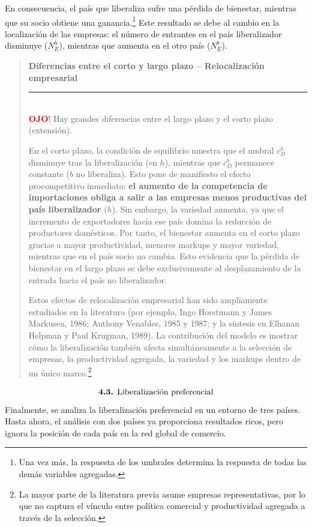 \documentclass[10pt,a4paper]{article}
\newenvironment{specialblock}[1]{%
      \begin{quote} %
      \small %
      \noindent\textbf{#1}\\[-0.3em] %
      \rule{\linewidth}{0.4pt}\\[0.6em]}{
      \end{quote}}
\begin{document}
En consecuencia, el país que liberaliza sufre una pérdida de bienestar, mientras que su socio obtiene una ganancia.\footnote{%
    Una vez más, la respuesta de los umbrales determina la respuesta de todas las demás variables agregadas.
} Este resultado se debe al cambio en la localización de las empresas: el número de entrantes en el país liberalizador disminuye ($N_E^h$), mientras que aumenta en el otro país ($N_E^b$).

\begin{specialblock}{Diferencias entre el corto y largo plazo -- Relocalización empresarial}
    \textcolor{red}{\textbf{OJO}!} Hay grandes diferencias entre el largo plazo y el corto plazo (extensión).
    
    En el corto plazo, la condición de equilibrio muestra que el umbral $c_D^h$ disminuye tras la liberalización (en $h$), mientras que $c_D^b$ permanece constante ($b$ no liberaliza). Esto pone de manifiesto el efecto procompetitivo inmediato: \textbf{el aumento de la competencia de importaciones obliga a salir a las empresas menos productivas del país liberalizador} ($h$). Sin embargo, la variedad aumenta, ya que el incremento de exportadores hacia ese país domina la reducción de productores domésticos. Por tanto, el bienestar aumenta en el corto plazo gracias a mayor productividad, menores markups y mayor variedad, mientras que en el país socio no cambia. Esto evidencia que la pérdida de bienestar en el largo plazo se debe exclusivamente al desplazamiento de la entrada hacia el país no liberalizador.

    Estos efectos de relocalización empresarial han sido ampliamente estudiados en la literatura (por ejemplo, Ingo Horstmann y James Markusen, 1986; Anthony Venables, 1985 y 1987; y la síntesis en Elhanan Helpman y Paul Krugman, 1989). La contribución del modelo es mostrar cómo la liberalización también afecta simultáneamente a la selección de empresas, la productividad agregada, la variedad y los markups dentro de un único marco.\footnote{%
        La mayor parte de la literatura previa asume empresas representativas, por lo que no captura el vínculo entre política comercial y productividad agregada a través de la selección.
    }
\end{specialblock}

$$\text{\textbf{4.3.} Liberalización preferencial}$$
Finalmente, se analiza la liberalización preferencial en un entorno de tres países. Hasta ahora, el análisis con dos países ya proporciona resultados ricos, pero ignora la posición de cada país en la red global de comercio. 
\end{document}
